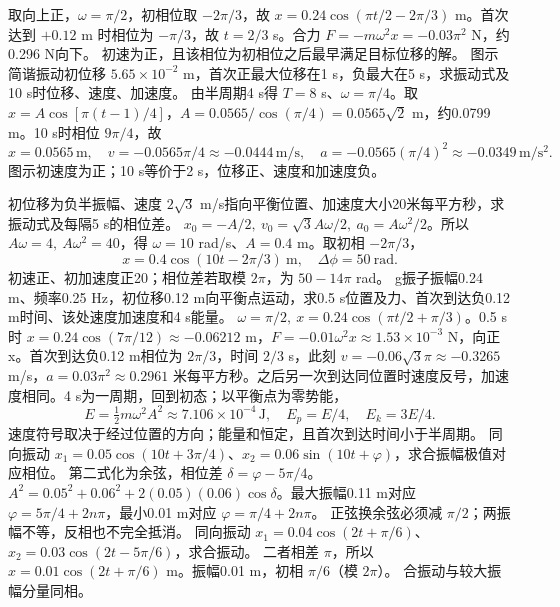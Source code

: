 \workings 取向上正，$\omega=\pi/2$，初相位取 $-2\pi/3$，故 $x=0.24\cos(\pi t/2-2\pi/3)$ m。首次达到 $+0.12$ m 时相位为 $-\pi/3$，故 $t=2/3$ s。合力 $F=-m\omega^2x=-0.03\pi^2$ N，约0.296 N向下。
\crosscheck 初速为正，且该相位为初相位之后最早满足目标位移的解。
\problemtext 图示简谐振动初位移 $5.65\times10^{-2}$ m，首次正最大位移在1 s，负最大在5 s，求振动式及10 s时位移、速度、加速度。
\workings 由半周期4 s得 $T=8$ s、$\omega=\pi/4$。取 $x=A\cos[\pi(t-1)/4]$，$A=0.0565/\cos(\pi/4)=0.0565\sqrt2$ m，约0.0799 m。10 s时相位 $9\pi/4$，故
\[
x=0.0565\,\mathrm m,\quad v=-0.0565\pi/4\approx-0.0444\,\mathrm{m/s},\quad
a=-0.0565(\pi/4)^2\approx-0.0349\,\mathrm{m/s^2}.
\]
\crosscheck 图示初速度为正；10 s等价于2 s，位移正、速度和加速度负。

\problemtext 初位移为负半振幅、速度 $2\sqrt3$ m/s指向平衡位置、加速度大小20米每平方秒，求振动式及每隔5 s的相位差。
\workings $x_0=-A/2,\ v_0=\sqrt3 A\omega/2,\ a_0=A\omega^2/2$。所以 $A\omega=4,\ A\omega^2=40$，得 $\omega=10$ rad/s、$A=0.4$ m。取初相 $-2\pi/3$，
\[
x=0.4\cos(10t-2\pi/3)\ \mathrm m,\quad \Delta\phi=50\ \mathrm{rad}.
\]
\crosscheck 初速正、初加速度正20；相位差若取模 $2\pi$，为 $50-14\pi$ rad。
 g振子振幅0.24 m、频率0.25 Hz，初位移0.12 m向平衡点运动，求0.5 s位置及力、首次到达负0.12 m时间、该处速度加速度和4 s能量。
\workings $\omega=\pi/2,\ x=0.24\cos(\pi t/2+\pi/3)$。0.5 s时 $x=0.24\cos(7\pi/12)\approx-0.06212$ m，$F=-0.01\omega^2x\approx1.53\times10^{-3}$ N，向正x。首次到达负0.12 m相位为 $2\pi/3$，时间 $2/3$ s，此刻 $v=-0.06\sqrt3\pi\approx-0.3265$ m/s，$a=0.03\pi^2\approx0.2961$ 米每平方秒。之后另一次到达同位置时速度反号，加速度相同。4 s为一周期，回到初态；以平衡点为零势能，
\[
E=\tfrac12m\omega^2A^2\approx7.106\times10^{-4}\,\mathrm J,\quad
E_p=E/4,\quad E_k=3E/4.
\]
\crosscheck 速度符号取决于经过位置的方向；能量和恒定，且首次到达时间小于半周期。
\problemtext 同向振动 $x_1=0.05\cos(10t+3\pi/4)$、$x_2=0.06\sin(10t+\varphi)$，求合振幅极值对应相位。
\workings 第二式化为余弦，相位差 $\delta=\varphi-5\pi/4$。$A^2=0.05^2+0.06^2+2(0.05)(0.06)\cos\delta$。最大振幅0.11 m对应 $\varphi=5\pi/4+2n\pi$，最小0.01 m对应 $\varphi=\pi/4+2n\pi$。
\crosscheck 正弦换余弦必须减 $\pi/2$；两振幅不等，反相也不完全抵消。
\problemtext 同向振动 $x_1=0.04\cos(2t+\pi/6)$、$x_2=0.03\cos(2t-5\pi/6)$，求合振动。
\workings 二者相差 $\pi$，所以 $x=0.01\cos(2t+\pi/6)$ m。振幅0.01 m，初相 $\pi/6$（模 $2\pi$）。
\crosscheck 合振动与较大振幅分量同相。

